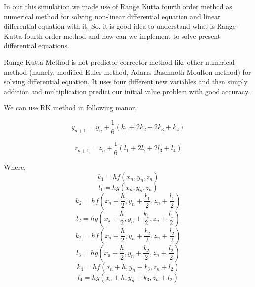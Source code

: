 \documentclass[11pt,a4paper]{article}
\begin{document}
In our this simulation we made use of Range Kutta fourth order method as numerical method for solving non-linear differential equation and linear differential equation with it. So, it is good idea to understand what is Range-Kutta fourth order method and how can we implement to solve present differential equations.

Runge Kutta Method is not predictor-corrector method like other numerical method (namely, modified Euler method, Adams-Bashmoth-Moulton method) for solving differential equation. It uses four different new variables and then simply addition and multiplication predict our initial value problem with good accuracy.

We can use RK method in following manor,

\begin{equation*}
y_{n+1} = y_{n}+\frac{1}{6}(k_{1}+2k_{2}+2k_{3}+k_{4})
\end{equation*}

\begin{equation*}
z_{n+1} = z_{n}+\frac{1}{6}(l_{1}+2l_{2}+2l_{3}+l_{4})
\end{equation*}

Where,
\begin{equation*}
k_{1}=hf(x_{n},y_{n},z_{n})
\end{equation*}
\begin{equation*}
l_{1}=hg(x_{n},y_{n},z_{n})
\end{equation*}
\begin{equation*}
k_{2}=hf(x_{n}+\frac{h}{2},y_{n}+\frac{k_{1}}{2},z_{n}+\frac{l_{1}}{2})
\end{equation*}
\begin{equation*}
l_{2}=hg(x_{n}+\frac{h}{2},y_{n}+\frac{k_{1}}{2},z_{n}+\frac{l_{1}}{2})
\end{equation*}
\begin{equation*}
k_{3}=hf(x_{n}+\frac{h}{2},y_{n}+\frac{k_{2}}{2},z_{n}+\frac{l_{2}}{2})
\end{equation*}
\begin{equation*}
l_{3}=hg(x_{n}+\frac{h}{2},y_{n}+\frac{k_{2}}{2},z_{n}+\frac{l_{2}}{2})
\end{equation*}
\begin{equation*}
k_{4}=hf(x_{n}+h,y_{n}+k_{3},z_{n}+l_{2})
\end{equation*}
\begin{equation*}
l_{4}=hg(x_{n}+h,y_{n}+k_{3},z_{n}+l_{2})
\end{equation*}
\end{document}
